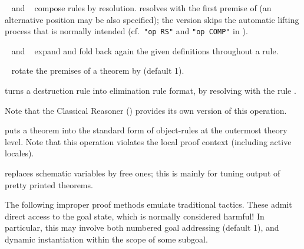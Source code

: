 \begin{isabellebody}
\begin{isamarkuptext}
\begin{descr}
  \item [\mbox{\isa{THEN}}~\isa{a} and \mbox{\isa{COMP}}~\isa{a}]
  compose rules by resolution.  \mbox{} resolves with the
  first premise of  (an alternative position may be also
  specified); the \mbox{} version skips the automatic
  lifting process that is normally intended (cf.\ \verb|"op RS"| and
  \verb|"op COMP"| in \cite[\S5]{isabelle-ref}).
  
  \item [\mbox{\isa{unfolded}}~\isa{{\isachardoublequote}a\isactrlsub {\isadigit{1}}\ {\isasymdots}\ a\isactrlsub n{\isachardoublequote}} and
  \mbox{\isa{folded}}~\isa{{\isachardoublequote}a\isactrlsub {\isadigit{1}}\ {\isasymdots}\ a\isactrlsub n{\isachardoublequote}}] expand and fold
  back again the given definitions throughout a rule.

  \item [\mbox{\isa{rotated}}~\isa{n}] rotate the premises of a
  theorem by  (default 1).

  \item [\mbox{\isa{Pure{\isachardot}elim{\isacharunderscore}format}}] turns a destruction rule into
  elimination rule format, by resolving with the rule .
  
  Note that the Classical Reasoner () provides
  its own version of this operation.

  \item [\mbox{\isa{standard}}] puts a theorem into the standard form
  of object-rules at the outermost theory level.  Note that this
  operation violates the local proof context (including active
  locales).

  \item [\mbox{\isa{no{\isacharunderscore}vars}}] replaces schematic variables by free
  ones; this is mainly for tuning output of pretty printed theorems.

  \end{descr}%
\end{isamarkuptext}%
\isamarkuptrue%
%
\isamarkuptrue%
%
\begin{isamarkuptext}%
The following improper proof methods emulate traditional tactics.
  These admit direct access to the goal state, which is normally
  considered harmful!  In particular, this may involve both numbered
  goal addressing (default 1), and dynamic instantiation within the
  scope of some subgoal.


\end{isamarkuptext}
\end{isabellebody}

